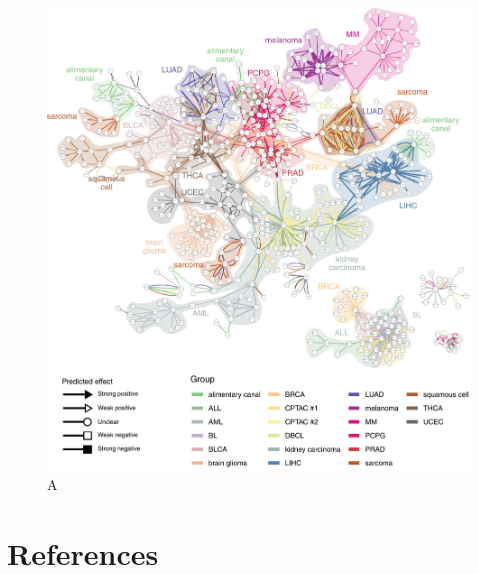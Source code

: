 \begin{figure}[htb!]
	\centering
	\includegraphics[width=\linewidth]{fig/tcga/grouped_interactions.pdf} 
	\caption{
		A
	}
	\label{fig:tcga}
\end{figure}



\clearpage
\section{References}
\printbibliography[heading=none]
